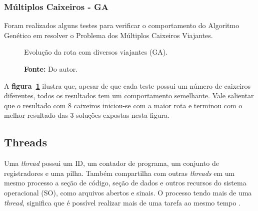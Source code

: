 \documentclass[12pt,openright,a4paper,oneside]{tcc}
\begin{document}
        \newpage
		\subsubsection{Múltiplos Caixeiros - GA}

		Foram realizados alguns testes para verificar o comportamento do Algoritmo Genético em resolver o Problema dos Múltiplos Caixeiros Viajantes.

		\begin{figure}[h]
			\centering
            \caption{Evolução da rota com diversos viajantes (GA).}
			\caption*{\textbf{Fonte:} Do autor.}
			\label{figgaga}
		\end{figure}

		A \textbf{figura~\ref{figgaga}} ilustra que, apesar de que cada teste possui um número de caixeiros diferentes, todos os resultados tem um comportamento semelhante. Vale salientar que o resultado com 8 caixeiros iniciou-se com a maior rota e terminou com o melhor resultado das 3 soluções expostas nesta figura.

		\subsection{Threads}

		Uma \textit{thread} possui um ID, um contador de programa, um conjunto de registradores e uma pilha. Também compartilha com outras \textit{threads} em um mesmo processo a seção de código, seção de dados e outros recursos do sistema operacional (SO), como arquivos abertos e sinais. 
		O processo tendo mais de uma \textit{thread}, significa que é possível realizar mais de uma tarefa ao mesmo tempo \cite{THREAD}.		
		\newpage
\end{document}
